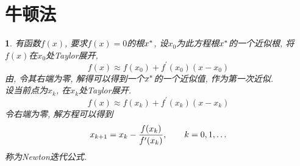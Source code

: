 
\section{牛顿法}
\newtheorem{newton_method}{}[section]
\newtheorem{the_speed_of_newton_method_convergence}{\theo}[section]

\begin{newton_method}
    \label{definition:newton_method}
    有函数$f(x)$, 要求$f(x)=0$的根$x^\ast$, 设$x_0$为此方程根$x^\ast$的一个近似根, %
    将$f(x)$在$x_0$处Taylor展开,
    \begin{equation}
        \label{taylorone}
        f(x) \approx f(x_0) + f^\prime(x_0)(x-x_0)
    \end{equation}
    由, 令其右端为零, 解得可以得到一个$x^\ast$的一个近似值, 作为第一次近似.\\
    设当前点为$x_k$, 在$x_k$处Taylor展开.
    \begin{equation*}
        f(x)\approx f(x_k) + f^\prime(x_k)(x - x_k)
    \end{equation*}
    令右端为零, 解方程可以得到
    \begin{equation}
        \label{equation:newton_iteravite}
        x_{k+1} = x_k - {f(x_k)\over f^\prime(x_k)},\quad\quad k= 0, 1, \ldots
    \end{equation}
    称为Newton迭代公式.
\end{newton_method}

\medskip

\begin{newton_algorithm}[Newton法]
    \label{algorithm:newton_algorithm}
    \hfill\break{}
\end{newton_algorithm}

\medskip

